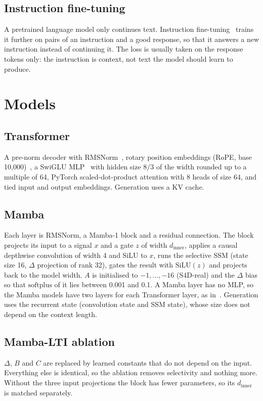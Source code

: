 \documentclass[conference]{IEEEtran}
\begin{document}
\subsection{Instruction fine-tuning}
A pretrained language model only continues text. Instruction fine-tuning~\cite{wei2022flan} trains it
further on pairs of an instruction and a good response, so that it answers a new instruction instead of
continuing it. The loss is usually taken on the response tokens only: the instruction is context, not
text the model should learn to produce.

\section{Models}

\subsection{Transformer}
A pre-norm decoder with RMSNorm~\cite{zhang2019rmsnorm}, rotary position embeddings
(RoPE, base 10,000)~\cite{su2021roformer}, a SwiGLU MLP~\cite{shazeer2020glu} with hidden size $8/3$ of
the width rounded up to a multiple of 64, PyTorch scaled-dot-product attention with 8 heads of size 64,
and tied input and output embeddings. Generation uses a KV cache.

\subsection{Mamba}
Each layer is RMSNorm, a Mamba-1 block and a residual connection. The block projects its input to a
signal $x$ and a gate $z$ of width $d_\text{inner}$, applies a causal depthwise convolution of width 4
and SiLU to $x$, runs the selective SSM (state size 16, $\Delta$ projection of rank 32), gates the
result with $\mathrm{SiLU}(z)$ and projects back to the model width. $A$ is initialised to
$-1,\dots,-16$ (S4D-real) and the $\Delta$ bias so that $\mathrm{softplus}$ of it lies between 0.001
and 0.1. A Mamba layer has no MLP, so the Mamba models have two layers for each Transformer layer, as
in~\cite{gu2023mamba}. Generation uses the recurrent state (convolution state and SSM state), whose
size does not depend on the context length.

\subsection{Mamba-LTI ablation}
$\Delta$, $B$ and $C$ are replaced by learned constants that do not depend on the input. Everything
else is identical, so the ablation removes selectivity and nothing more. Without the three input
projections the block has fewer parameters, so its $d_\text{inner}$ is matched separately.
\end{document}
